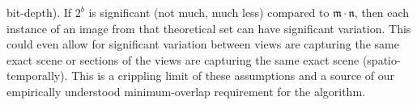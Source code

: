 bit-depth). If $2^{b}$ is significant (\ie not much, much less) compared to $\mathfrak{m} \cdot \mathfrak{n}$, then each instance of an image from that theoretical set can have significant variation. This could even allow for significant variation between views are capturing the same exact scene or sections of the views are capturing the same exact scene (spatio-temporally). This is a crippling limit of these assumptions and a source of our empirically understood minimum-overlap requirement for the algorithm.



